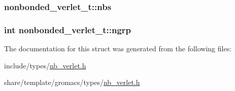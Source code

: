 \hypertarget{structnonbonded__verlet__t_a94f84c4baa8b982529549b8024c87541}{
\subsubsection[{nbs}]{ {\bf nonbonded\-\_\-verlet\-\_\-t\-::nbs}}}\label{structnonbonded__verlet__t_a94f84c4baa8b982529549b8024c87541}
\hypertarget{structnonbonded__verlet__t_aedf87f8d2c959c49f09c4f733f93ed7f}{
\subsubsection[{ngrp}]{\setlength{\rightskip}{0pt plus 5cm}int {\bf nonbonded\-\_\-verlet\-\_\-t\-::ngrp}}}\label{structnonbonded__verlet__t_aedf87f8d2c959c49f09c4f733f93ed7f}


\-The documentation for this struct was generated from the following files\-:\begin{DoxyCompactItemize}
\item 
include/types/\hyperlink{include_2types_2nb__verlet_8h}{nb\-\_\-verlet.\-h}\item 
share/template/gromacs/types/\hyperlink{share_2template_2gromacs_2types_2nb__verlet_8h}{nb\-\_\-verlet.\-h}\end{DoxyCompactItemize}
